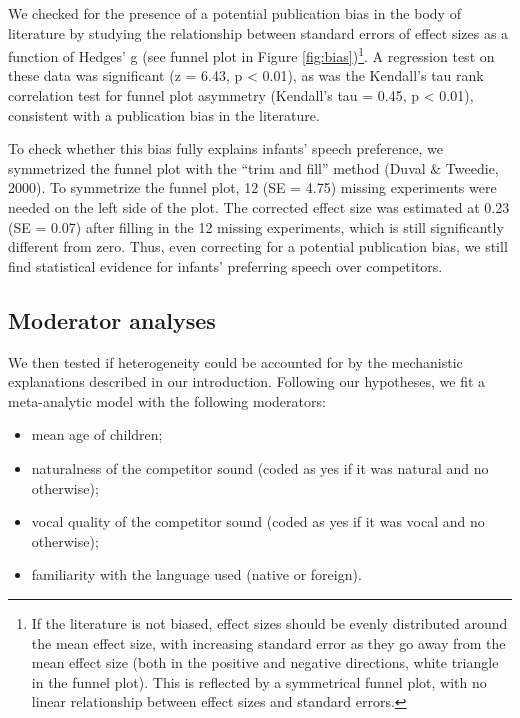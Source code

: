 \documentclass[
  english,
  man]{apa6}
\providecommand{\tightlist}{%
  \setlength{\itemsep}{0pt}\setlength{\parskip}{0pt}}
\begin{document}
We checked for the presence of a potential publication bias in the body of literature by studying the relationship between standard errors of effect sizes as a function of Hedges' g (see funnel plot in Figure \ref{fig:bias})\footnote{If the literature is not biased, effect sizes should be evenly distributed around the mean effect size, with increasing standard error as they go away from the mean effect size (both in the positive and negative directions, white triangle in the funnel plot). This is reflected by a symmetrical funnel plot, with no linear relationship between effect sizes and standard errors.}. A regression test on these data was significant (z = 6.43, p \textless{} 0.01), as was the Kendall's tau rank correlation test for funnel plot asymmetry (Kendall's tau = 0.45, p \textless{} 0.01), consistent with a publication bias in the literature.

To check whether this bias fully explains infants' speech preference, we symmetrized the funnel plot with the ``trim and fill'' method (Duval \& Tweedie, 2000). To symmetrize the funnel plot, 12 (SE = 4.75) missing experiments were needed on the left side of the plot. The corrected effect size was estimated at 0.23 (SE = 0.07) after filling in the 12 missing experiments, which is still significantly different from zero. Thus, even correcting for a potential publication bias, we still find statistical evidence for infants' preferring speech over competitors.

\hypertarget{moderator-analyses}{%
\subsection{Moderator analyses}\label{moderator-analyses}}

We then tested if heterogeneity could be accounted for by the mechanistic explanations described in our introduction. Following our hypotheses, we fit a meta-analytic model with the following moderators:

\begin{itemize}
\tightlist
\item
  mean age of children;
\item
  naturalness of the competitor sound (coded as yes if it was natural and no otherwise);
\item
  vocal quality of the competitor sound (coded as yes if it was vocal and no otherwise);
\item
  familiarity with the language used (native or foreign).
\end{itemize}
\end{document}
